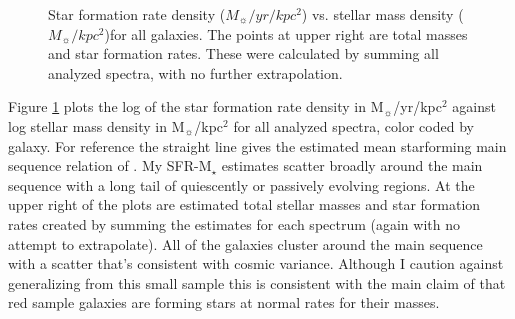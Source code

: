 \documentclass[modern]{aastex62}
\begin{document}
\begin{figure}[ht]
\caption{Star formation rate density ($M_\sun/yr/kpc^2$) vs. stellar mass density ($M_\sun/kpc^2$)for all galaxies. The points at upper right are total masses and star formation rates. These were calculated by summing all analyzed spectra, with no further extrapolation.}
\label{fig:sigmasfrsigmamstar}
\end{figure}

Figure \ref{fig:sigmasfrsigmamstar} plots the log of the star formation rate density in M$_\sun$/yr/kpc$^2$ against log stellar mass density in M$_\sun$/kpc$^2$ for all analyzed spectra, color coded by galaxy. For reference the straight line gives the estimated mean starforming main sequence relation of \citet{2015ApJ...801L..29R}. My SFR-M$_\star$ estimates scatter broadly around the main sequence with a long tail of quiescently or passively evolving regions. At the upper right of the plots are estimated total stellar masses and star formation rates created by summing the estimates for each spectrum (again with no attempt to extrapolate). All of the galaxies cluster around the main sequence with a scatter that's consistent with cosmic variance. Although I caution against generalizing from this small sample this is consistent with the main claim of  that red sample galaxies are forming stars at normal rates for their masses.
\end{document}
